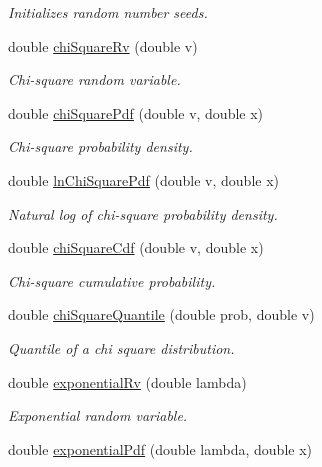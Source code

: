 \begin{DoxyCompactItemize}
\begin{DoxyCompactList}\small\item\em Initializes random number seeds. \end{DoxyCompactList}\item 
double \mbox{\hyperlink{class_mb_random_aadb67cce448b60c9837edef5792c0a8a}{chi\+Square\+Rv}} (double v)
\begin{DoxyCompactList}\small\item\em Chi-\/square random variable. \end{DoxyCompactList}\item 
double \mbox{\hyperlink{class_mb_random_ad690dfe778f65e8fb6b00789396186fd}{chi\+Square\+Pdf}} (double v, double x)
\begin{DoxyCompactList}\small\item\em Chi-\/square probability density. \end{DoxyCompactList}\item 
double \mbox{\hyperlink{class_mb_random_a814eac2d13019b2f99af06d50eb48499}{ln\+Chi\+Square\+Pdf}} (double v, double x)
\begin{DoxyCompactList}\small\item\em Natural log of chi-\/square probability density. \end{DoxyCompactList}\item 
double \mbox{\hyperlink{class_mb_random_a251af825995d41479ca15e965077d101}{chi\+Square\+Cdf}} (double v, double x)
\begin{DoxyCompactList}\small\item\em Chi-\/square cumulative probability. \end{DoxyCompactList}\item 
double \mbox{\hyperlink{class_mb_random_a065a95c81bf9009ad4708d0fce9861be}{chi\+Square\+Quantile}} (double prob, double v)
\begin{DoxyCompactList}\small\item\em Quantile of a chi square distribution. \end{DoxyCompactList}\item 
double \mbox{\hyperlink{class_mb_random_a52cdee648466e81c29c27d4729af8245}{exponential\+Rv}} (double lambda)
\begin{DoxyCompactList}\small\item\em Exponential random variable. \end{DoxyCompactList}\item 
double \mbox{\hyperlink{class_mb_random_a3a9018e4866bd9c61b0e8bc28c2f177e}{exponential\+Pdf}} (double lambda, double x)

\end{DoxyCompactItemize}
